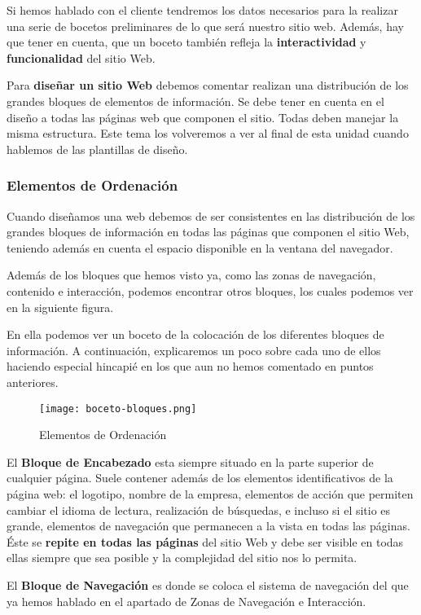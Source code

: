 Si hemos hablado con el cliente tendremos los datos necesarios para la realizar una serie de bocetos preliminares de lo que será nuestro sitio web. Además, hay que tener en cuenta, que un boceto también refleja la \textbf{interactividad} y \textbf{funcionalidad} del sitio Web.

Para \textbf{diseñar un sitio Web} debemos comentar realizan una distribución de los grandes bloques de elementos de información. Se debe tener en cuenta en el diseño a todas las páginas web que componen el sitio. Todas deben manejar la misma estructura. Este tema los volveremos a ver al final de esta unidad cuando hablemos de las plantillas de diseño.

\subsubsection{Elementos de Ordenación}
Cuando diseñamos una web debemos de ser consistentes en las distribución de los grandes bloques de información en todas las páginas que componen el sitio Web, teniendo además en cuenta el espacio disponible en la ventana del navegador.

Además de los bloques que hemos visto ya, como las zonas de navegación, contenido e interacción, podemos encontrar otros bloques, los cuales podemos ver en la siguiente figura.

En ella podemos ver un boceto de la colocación de los diferentes bloques de información. A continuación, explicaremos un poco sobre cada uno de ellos haciendo especial hincapié en los que aun no hemos comentado en puntos anteriores.

\begin{figure}[H]
    \centering
    \texttt{[image: boceto-bloques.png]}
    \caption{Elementos de Ordenación}
\end{figure}

El \textbf{Bloque de Encabezado} esta siempre situado en la parte superior de cualquier página. Suele contener además de los elementos identificativos de la página web: el logotipo, nombre de la empresa, elementos de acción que permiten cambiar el idioma de lectura, realización de búsquedas, e incluso si el sitio es grande, elementos de navegación que permanecen a la vista en todas las páginas. Éste se \textbf{repite en todas las páginas} del sitio Web y debe ser visible en todas ellas siempre que sea posible y la complejidad del sitio nos lo permita.

El \textbf{Bloque de Navegación} es donde se coloca el sistema de navegación del que ya hemos hablado en el apartado  de Zonas de Navegación e Interacción.

